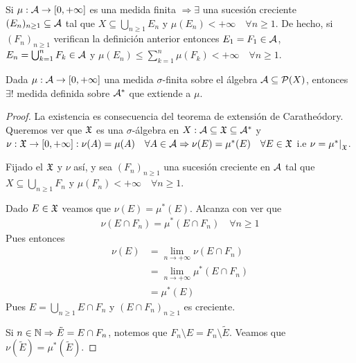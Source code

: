 \begin{note}
    Si $\mu : \mathcal{A} \to [0, +\infty]$ es una medida finita $\Rightarrow \exists$ una sucesión creciente $(E_n)_{n \geq 1} \subseteq \mathcal{A}$ tal que $X \subseteq \bigcup_{n \geq 1} E_n$
    y $\mu(E_n) < +\infty \quad \forall n \geq 1$. De hecho, si $(F_n)_{n \geq 1}$ verifican la definición anterior entonces $E_1 = F_1 \in \mathcal{A}$,
    $E_n = \bigcup_{k = 1}^n F_k \in \mathcal{A}$ y $\mu(E_n) \leq \sum_{k = 1}^n \mu(F_k) < +\infty \quad \forall n \geq 1$.
\end{note}

\begin{theorem}
    Dada $\mu : \mathcal{A} \to [0, +\infty]$ una medida $\sigma$-finita sobre el álgebra $\mathcal{A} \subseteq \mathcal{P}(X)$, entonces $\exists!$ medida definida sobre $\mathcal{A}^*$ que extiende a $\mu$.

    \begin{proof}
        La existencia es consecuencia del teorema de extensión de Caratheódory. Queremos ver que $\mathfrak{X}$ es una $\sigma$-álgebra en $X : \mathcal{A} \subseteq \mathfrak{X} \subseteq \mathcal{A}^*$
        y $\nu : \mathfrak{X} \to [0, +\infty] : \nu(A) = \mu(A) \quad \forall A \in \mathcal{A} \Rightarrow \nu(E) = \mu^*(E) \quad \forall E \in \mathfrak{X}$ i.e $\nu = \restr{\mu^*}{\mf{X}}$.

        Fijado el $\mathfrak{X}$ y $\nu$ así, y sea $(F_n)_{n \geq 1} $ una sucesión creciente en $\mathcal{A}$ tal que $X \subseteq \bigcup_{n \geq 1} F_n$ y $\mu(F_n) < +\infty \quad \forall n \geq 1$.

        Dado $E \in \mathfrak{X}$ veamos que $\nu(E) = \mu^*(E)$. Alcanza con ver que \begin{align*}
            \nu(E \cap F_n) = \mu^*(E \cap F_n) \quad \forall n \geq 1
        \end{align*}
        Pues entonces \begin{align*}
            \nu(E) & = \lim_{n \to +\infty} \nu(E \cap F_n)   \\
                   & = \lim_{n \to +\infty} \mu^*(E \cap F_n) \\
                   & = \mu^*(E)
        \end{align*}
        Pues $E = \bigcup_{n \geq 1} E \cap F_n$ y $(E \cap F_n)_{n \geq 1}$ es creciente.

        Si $n \in \mathbb{N} \Rightarrow \tilde{E} = E \cap F_n$, notemos que $F_n \setminus E = F_n \setminus \tilde{E}$. Veamos que $\nu(\tilde{E}) = \mu^*(\tilde{E})$.


\end{proof}
\end{theorem}
